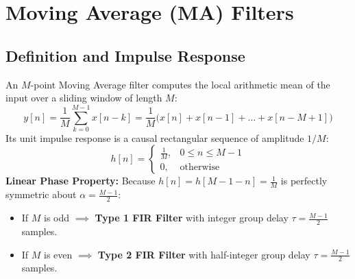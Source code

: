 \documentclass[11pt,a4paper]{article}
\begin{document}
\section{Moving Average (MA) Filters}

\subsection{Definition and Impulse Response}
An $M$-point Moving Average filter computes the local arithmetic mean of the input over a sliding window of length $M$:
\begin{equation}
y[n] = \frac{1}{M}\sum_{k=0}^{M-1} x[n-k] = \frac{1}{M}\big(x[n] + x[n-1] + \dots + x[n-M+1]\big)
\end{equation}
Its unit impulse response is a causal rectangular sequence of amplitude $1/M$:
\begin{equation}
h[n] = \begin{cases} \frac{1}{M}, & 0 \le n \le M-1 \\ 0, & \text{otherwise} \end{cases}
\end{equation}
\textbf{Linear Phase Property:} Because $h[n] = h[M-1-n] = \frac{1}{M}$ is perfectly symmetric about $\alpha = \frac{M-1}{2}$:
\begin{itemize}
    \item If $M$ is odd $\implies$ \textbf{Type 1 FIR Filter} with integer group delay $\tau = \frac{M-1}{2}$ samples.
    \item If $M$ is even $\implies$ \textbf{Type 2 FIR Filter} with half-integer group delay $\tau = \frac{M-1}{2}$ samples.
\end{itemize}
\end{document}
